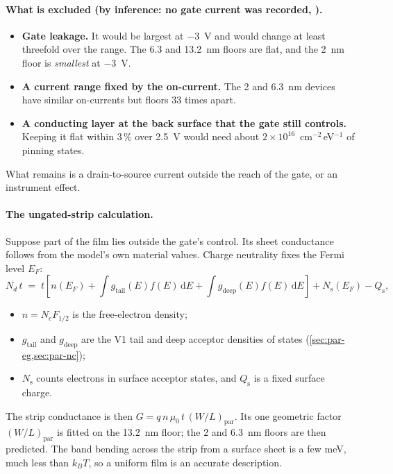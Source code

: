 \paragraph{What is excluded (by inference: no gate current was recorded, ).}
\begin{itemize}
\item \textbf{Gate leakage.} It would be largest at $-3$~V and would change at least threefold over the range. The
6.3 and 13.2~nm floors are flat, and the 2~nm floor is \emph{smallest} at $-3$~V.
\item \textbf{A current range fixed by the on-current.} The 2 and 6.3~nm devices have similar on-currents but floors
33 times apart.
\item \textbf{A conducting layer at the back surface that the gate still controls.} Keeping it flat within 3\,\% over
2.5~V would need about $2\times10^{16}$~cm$^{-2}$\,eV$^{-1}$ of pinning states.
\end{itemize}
What remains is a drain-to-source current outside the reach of the gate, or an instrument effect.

\paragraph{The ungated-strip calculation.} Suppose part of the film lies outside the gate's control. Its sheet
conductance follows from the model's own material values. Charge neutrality fixes the Fermi level $E_F$:
\begin{equation}
N_d\,t \;=\; t\left[n(E_F) + \int g_{\mathrm{tail}}(E) f(E)\,\mathrm{d}E + \int g_{\mathrm{deep}}(E) f(E)\,\mathrm{d}E\right]
 + N_{\mathrm{s}}(E_F) - Q_{\mathrm{s}},
\label{eq:v2-neutral}
\end{equation}
\begin{itemize}
\item $n = N_c F_{1/2}$ is the free-electron density;
\item $g_{\mathrm{tail}}$ and $g_{\mathrm{deep}}$ are the V1 tail and deep acceptor densities of states (\cref{sec:par-eg,sec:par-nc});
\item $N_{\mathrm{s}}$ counts electrons in surface acceptor states, and $Q_{\mathrm{s}}$ is a fixed surface charge.
\end{itemize}
The strip conductance is then $G = q\,n\,\mu_0\,t\,(W/L)_{\mathrm{par}}$. Its one geometric factor $(W/L)_{\mathrm{par}}$
is fitted on the 13.2~nm floor; the 2 and 6.3~nm floors are then predicted. The band bending across the strip from a
surface sheet is a few meV, much less than $k_BT$, so a uniform film is an accurate description.

